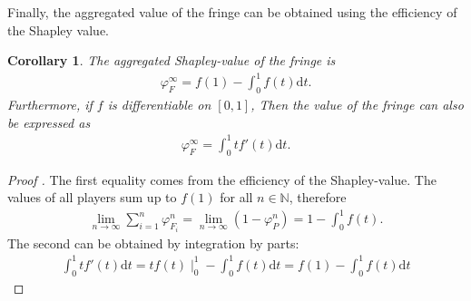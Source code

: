 \documentclass[a4paper]{article}
\newtheorem{corollary}{Corollary}
\newcommand{\dt}{\mathrm{d}t}
\begin{document}
Finally, the aggregated value of the fringe can be obtained using the efficiency of the Shapley value.

\begin{corollary}
    \label{cor:fringe_value}
    The aggregated Shapley-value of the fringe is
    \begin{align*}
        \varphi_F^\infty = f(1) - \int_0^1 f(t) \dt.
    \end{align*}
    Furthermore, if $f$ is differentiable on $[0, 1]$, Then the value of the fringe can also be expressed as
    \begin{align*}
        \varphi_F^\infty = \int_0^1 t f'(t) \dt.
    \end{align*}
\end{corollary}

\begin{proof}[Proof%
    ]
    The first equality comes from the efficiency of the Shapley-value. The values of all players sum up to $f(1)$ for all $n \in \mathbb{N}$, therefore
    \begin{align*}
        \lim_{n \to \infty} \sum_{i=1}^n \varphi_{F_i}^n = \lim_{n \to \infty} (1 - \varphi_P^n ) = 1 - \int_0^1 f(t).
    \end{align*}
    The second can be obtained by integration by parts:
    \begin{align*}
        \int_0^1 t f'(t) \dt = tf(t) \mid_0^1 - \int_0^1 f(t) \dt = f(1) - \int_0^1 f(t) \dt
    \end{align*}
\end{proof}
\end{document}
